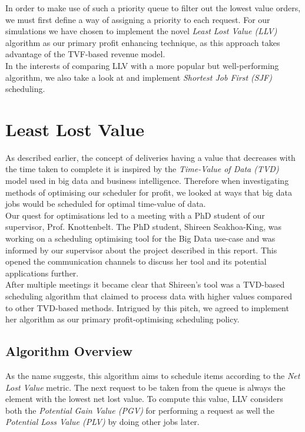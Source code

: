 \documentclass[a4paper,11pt,titlepage]{report}
\begin{document}
In order to make use of such a priority queue to filter out the lowest value orders, we must first define a way of assigning a priority to each request. For our simulations we have chosen to implement the novel \textit{Least Lost Value (LLV)} algorithm as our primary profit enhancing technique, as this approach takes advantage of the TVF-based revenue model.\\

In the interests of comparing LLV with a more popular but well-performing algorithm, we also take a look at and implement \textit{Shortest Job First (SJF)} scheduling.

\section{Least Lost Value}
As described earlier, the concept of deliveries having a value that decreases with the time taken to complete it is inspired by the \textit{Time-Value of Data (TVD)} model used in big data and business intelligence. Therefore when investigating methods of optimising our scheduler for profit, we looked at ways that big data jobs would be scheduled for optimal time-value of data.\\

Our quest for optimisations led to a meeting with a PhD student of our supervisor, Prof. Knottenbelt. The PhD student, Shireen Seakhoa-King, was working on a scheduling optimising tool for the Big Data use-case and was informed by our supervisor about the project described in this report. This opened the communication channels to discuss her tool and its potential applications further.\\

After multiple meetings it became clear that Shireen's tool was a TVD-based scheduling algorithm that claimed to process data with higher values compared to other TVD-based methods. Intrigued by this pitch, we agreed to implement her algorithm as our primary profit-optimising scheduling policy.

\subsection{Algorithm Overview}
As the name suggests, this algorithm aims to schedule items according to the \textit{Net Lost Value} metric. The next request to be taken from the queue is always the element with the lowest net lost value. To compute this value, LLV considers both the \textit{Potential Gain Value (PGV)} for performing a request as well the \textit{Potential Loss Value (PLV)} by doing other jobs later.\\
\end{document}
